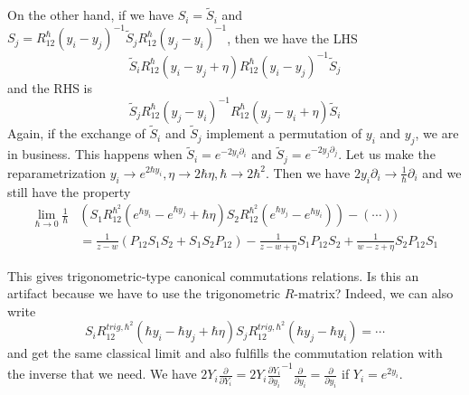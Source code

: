 \documentclass[11pt]{report}
\theoremstyle{definition}
\theoremstyle{remark}
\theoremstyle{remark}
\begin{document}
On the other hand, if we have $S_i = \tilde S_i$ and $S_j = R_{12}^\hbar(y_i-y_j)^{-1} \tilde S_j R_{12}^\hbar(y_j-y_i)^{-1}$, then we have the LHS
\begin{equation*}
\tilde S_i R_{12}^\hbar(y_i-y_j+\eta) R_{12}^\hbar(y_i-y_j)^{-1} \tilde S_j
\end{equation*}
and the RHS is
\begin{equation*}
\tilde S_j R_{12}^\hbar(y_j-y_i)^{-1} R_{12}^\hbar(y_j-y_i+\eta) \tilde S_i
\end{equation*}
Again, if the exchange of $\tilde S_i$ and $\tilde S_j$ implement a permutation of $y_i$ and $y_j$, we are in business. This happens when $\tilde S_i = e^{-2y_i \partial_i}$ and $\tilde S_j = e^{-2y_j \partial_j}$. Let us make the reparametrization $y_i \to e^{2 \hbar y_i},\eta \to 2 \hbar \eta, \hbar \to 2 \hbar^2$. Then we have $2 y_i \partial_i \to \frac{1}{\hbar} \partial_i$ and we still have the property
\begin{align*}
\lim_{\hbar \to 0} \frac{1}{\hbar} &(S_1 R_{12}^{\hbar^2}(e^{\hbar y_i}-e^{\hbar y_j}+\hbar \eta) S_2 R_{12}^{\hbar^2}(e^{\hbar y_j}-e^{\hbar y_i})) - (\cdots)) \\
&= \frac{1}{z-w} (P_{12} S_1 S_2 + S_1 S_2 P_{12}) - \frac{1}{z-w+\eta} S_1 P_{12} S_2 + \frac{1}{w-z+\eta} S_2 P_{12} S_1
\end{align*}

This gives trigonometric-type canonical commutations relations. Is this an artifact because we have to use the trigonometric $R$-matrix? Indeed, we can also write
\begin{equation*}
S_i R_{12}^{trig,\hbar^2}(\hbar y_i-\hbar y_j+\hbar\eta) S_j R_{12}^{trig,\hbar^2}(\hbar y_j- \hbar y_i) = \cdots
\end{equation*}
and get the same classical limit and also fulfills the commutation relation with the inverse that we need. We have $2Y_i \frac{\partial}{\partial Y_i} = 2Y_i \frac{\partial Y_i}{\partial y_i}^{-1} \frac{\partial}{\partial y_i} = \frac{\partial}{\partial y_i}$ if $Y_i = e^{2y_i}$.
\end{document}
